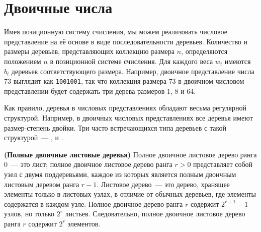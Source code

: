 \begin{frame}[fragile]{}
\inputminted{haskell}{code/DenseNumbers.hs}
\end{frame}

\begin{frame}[fragile]{}
\inputminted{haskell}{code/SparseByWeight.hs}
\end{frame}


\section{Двоичные числа}
\label{sc:9.2}

\begin{frame}[fragile]{}


Имея позиционную систему счисления, мы можем реализовать числовое
представление на её основе в виде последовательности
деревьев. Количество и размеры деревьев, представляющих коллекцию
размера $n$, определяются положением $n$ в позиционной системе
счисления. Для каждого веса $w_i$ имеются $b_i$ деревьев
соответствующего размера. Например, двоичное представление числа 73
выглядит как \texttt{1001001}, так что коллекция размера 73 в двоичном
числовом представлении будет содержать три дерева размеров 1, 8 и 64.

Как правило, деревья в числовых представлениях обладают весьма
регулярной структурой. Например, в двоичных числовых представлениях
все деревья имеют размер-степень двойки. Три часто встречающихся типа
деревьев с такой структурой~---  \cite{KaldewaijDielissen1996},  \cite{Vuillemin1978} и
 \cite{SackStrothotte1990}.

\end{frame}

\begin{frame}[fragile]{}

\begin{definition}
  \textbf{(Полные двоичные листовые деревья)} Полное двоичное листовое
  дерево ранга 0~--- это лист; полное двоичное листовое дерево ранга
  $r > 0$ представляет собой узел с двумя поддеревьями, каждое из
  которых является полным двоичным листовым деревом ранга $r -
  1$. Листовое дерево~--- это дерево, хранящее элементы только в
  листовых узлах, в отличие от обычных деревьев, где элементы
  содержатся в каждом узле. Полное двоичное дерево ранга $r$ содержит
  $2^{r+1} - 1$ узлов, но только $2^r$ листьев. Следовательно, полное
  двоичное листовое дерево ранга $r$ содержит $2^r$ элементов.
\end{definition}
\end{frame}

